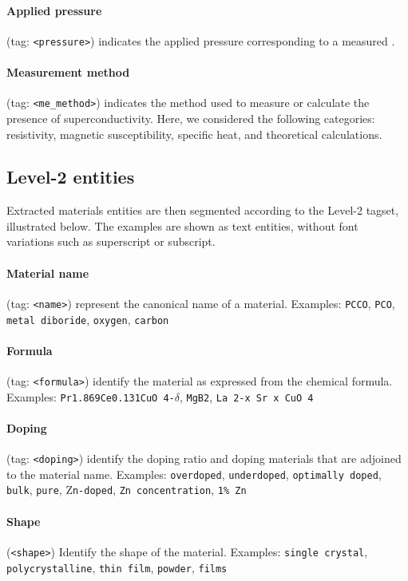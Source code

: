 \paragraph{Applied pressure} (tag: \texttt{<pressure>}) indicates the applied pressure corresponding to a measured \tc. 

\paragraph{Measurement method} (tag: \texttt{<me\_method>}) indicates the method used to measure or calculate the presence of superconductivity. Here, we considered the following categories: resistivity, magnetic susceptibility, specific heat, and theoretical calculations. 

\subsection{Level-2 entities}

Extracted materials entities are then segmented according to the Level-2 tagset, illustrated below. The examples are shown as text entities, without font variations such as superscript or subscript. 

\paragraph{Material name} (tag: \texttt{<name>}) represent the canonical name of a material. Examples: \texttt{PCCO}, \texttt{PCO}, \texttt{metal diboride}, \texttt{oxygen}, \texttt{carbon}

\paragraph{Formula} (tag: \texttt{<formula>}) identify the material as expressed from the chemical formula. Examples: \texttt{Pr1.869Ce0.131CuO 4-$\delta$}, \texttt{MgB2}, \texttt{La 2-x Sr x CuO 4}

\paragraph{Doping} (tag: \texttt{<doping>}) identify the doping ratio and doping materials that are adjoined to the material name. Examples: \texttt{overdoped}, \texttt{underdoped}, \texttt{optimally doped}, \texttt{bulk}, \texttt{pure}, Z\texttt{n-doped}, \texttt{Zn concentration}, \texttt{1\% Zn}

\paragraph{Shape} (\texttt{<shape>}) Identify the shape of the material. Examples: \texttt{single crystal}, \texttt{polycrystalline}, \texttt{thin film}, \texttt{powder}, \texttt{films}

